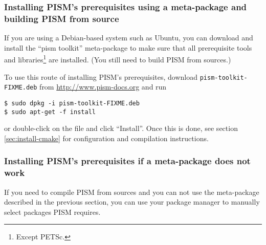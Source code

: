 \documentclass[titlepage,letterpaper,final]{scrartcl}
\begin{document}
\subsubsection{Installing PISM's prerequisites using a meta-package and building PISM from source}
\label{sec:deb-pism-toolkit}

If you are using a Debian-based system such as Ubuntu, you can download and
install the ``pism toolkit'' meta-package to make sure that all prerequisite
tools and libraries\footnote{Except PETSc.} are installed. (You still need to
build PISM from sources.)

To use this route of installing PISM's prerequisites, download
\texttt{pism-toolkit-FIXME.deb} from \url{http://www.pism-docs.org} and run
\begin{verbatim}
$ sudo dpkg -i pism-toolkit-FIXME.deb
$ sudo apt-get -f install
\end{verbatim}%
or double-click on the file and click ``Install''. Once this is done, see
section \ref{sec:install-cmake} for configuration and compilation instructions.

\subsubsection{Installing PISM's prerequisites if a meta-package does not work}
\label{sec:deb-libraries-by-hand}

If you need to compile PISM from sources and you can not use the meta-package
described in the previous section, you can use your package manager to manually
select packages PISM requires.
\end{document}
